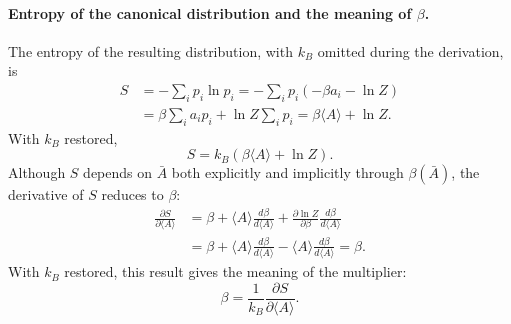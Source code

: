 \paragraph{Entropy of the canonical distribution and the meaning of $\beta$.}
The entropy of the resulting distribution, with $k_B$ omitted during the
derivation, is
\begin{align*}
    S &= -\sum_i p_i\ln p_i
    = -\sum_i p_i\left(-\beta a_i-\ln Z\right) \\
    &= \beta\sum_i a_i p_i+\ln Z\sum_i p_i
    = \beta\langle A\rangle+\ln Z.
\end{align*}
With $k_B$ restored,
\begin{equation}
    \boxed{S=k_B\left(\beta\langle A\rangle+\ln Z\right).}
\end{equation}
Although $S$ depends on $\bar A$ both explicitly and implicitly through
$\beta(\bar A)$, the derivative of $S$ reduces to $\beta$:
\begin{align*}
    \frac{\partial S}{\partial\langle A\rangle}
    &= \beta
    +\langle A\rangle\frac{d\beta}{d\langle A\rangle}
    +\frac{\partial\ln Z}{\partial\beta}\frac{d\beta}{d\langle A\rangle} \\
    &= \beta
    +\langle A\rangle\frac{d\beta}{d\langle A\rangle}
    -\langle A\rangle\frac{d\beta}{d\langle A\rangle}
    = \beta.
\end{align*}
With $k_B$ restored, this result gives the meaning of the multiplier:
\begin{equation}
    \boxed{\beta=\frac{1}{k_B}\frac{\partial S}{\partial\langle A\rangle}.}
\end{equation}

